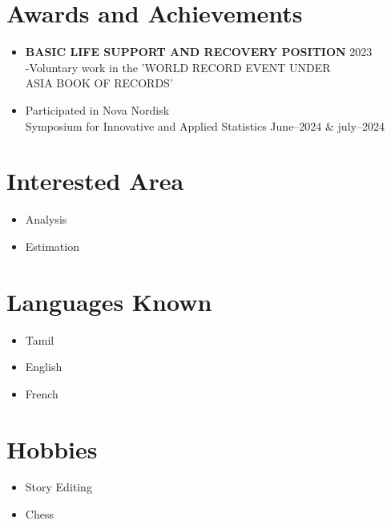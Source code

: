 \documentclass[a4paper,11pt]{article}
\begin{document}
	
	\section*{Awards and Achievements}
	\noindent
	\begin{itemize}
	\item 
	\textbf{BASIC LIFE SUPPORT AND RECOVERY POSITION} \hfill 2023 \\
	-Voluntary work in the 'WORLD RECORD EVENT UNDER \\ ASIA BOOK OF RECORDS'
	\item  Participated in Nova Nordisk \\ Symposium for Innovative and Applied Statistics \hfill June--2024 \& july--2024
   \end{itemize} 
	\section*{Interested Area}
	\begin{itemize}
		\item Analysis 
		\item Estimation 
		\end{itemize}
	\section*{Languages Known}
	\begin{itemize}
		\item Tamil 
		\item English 
		\item French
		
		\end{itemize}
	\section*{Hobbies}
	\begin{itemize}
		\item Story Editing
		\item Chess
		 \end{itemize}
\end{document}
